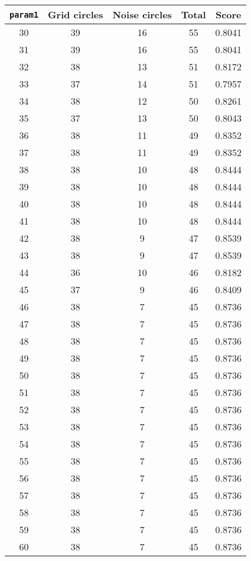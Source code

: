 \documentclass[letterpaper, 12pt]{article}
\begin{document}
\begin{longtable}{|c|c|c|c|c|}
\hline
\textbf{\texttt{param1}} & \textbf{Grid circles} & \textbf{Noise circles} & \textbf{Total} & \textbf{Score} \\
\hline
30 & 39 & 16 & 55 & 0.8041 \\
\hline
31 & 39 & 16 & 55 & 0.8041 \\
\hline
32 & 38 & 13 & 51 & 0.8172 \\
\hline
33 & 37 & 14 & 51 & 0.7957 \\
\hline
34 & 38 & 12 & 50 & 0.8261 \\
\hline
35 & 37 & 13 & 50 & 0.8043 \\
\hline
36 & 38 & 11 & 49 & 0.8352 \\
\hline
37 & 38 & 11 & 49 & 0.8352 \\
\hline
38 & 38 & 10 & 48 & 0.8444 \\
\hline
39 & 38 & 10 & 48 & 0.8444 \\
\hline
40 & 38 & 10 & 48 & 0.8444 \\
\hline
41 & 38 & 10 & 48 & 0.8444 \\
\hline
42 & 38 & 9 & 47 & 0.8539 \\
\hline
43 & 38 & 9 & 47 & 0.8539 \\
\hline
44 & 36 & 10 & 46 & 0.8182 \\
\hline
45 & 37 & 9 & 46 & 0.8409 \\
\hline
46 & 38 & 7 & 45 & 0.8736 \\
\hline
47 & 38 & 7 & 45 & 0.8736 \\
\hline
48 & 38 & 7 & 45 & 0.8736 \\
\hline
49 & 38 & 7 & 45 & 0.8736 \\
\hline
50 & 38 & 7 & 45 & 0.8736 \\
\hline
51 & 38 & 7 & 45 & 0.8736 \\
\hline
52 & 38 & 7 & 45 & 0.8736 \\
\hline
53 & 38 & 7 & 45 & 0.8736 \\
\hline
54 & 38 & 7 & 45 & 0.8736 \\
\hline
55 & 38 & 7 & 45 & 0.8736 \\
\hline
56 & 38 & 7 & 45 & 0.8736 \\
\hline
57 & 38 & 7 & 45 & 0.8736 \\
\hline
58 & 38 & 7 & 45 & 0.8736 \\
\hline
59 & 38 & 7 & 45 & 0.8736 \\
\hline
60 & 38 & 7 & 45 & 0.8736 \\
\hline

\end{longtable}
\end{document}
